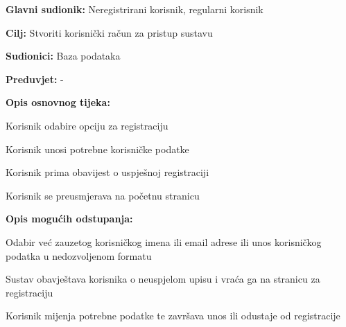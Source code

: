					\noindent {}
					\begin{packed_item}
	
						\item \textbf{Glavni sudionik: }Neregistrirani korisnik, regularni korisnik
						\item  \textbf{Cilj:} Stvoriti korisnički račun za pristup sustavu
						\item  \textbf{Sudionici:} Baza podataka
						\item  \textbf{Preduvjet:} -
						\item  \textbf{Opis osnovnog tijeka:}
						
						\item[] \begin{packed_enum}
	
							\item Korisnik odabire opciju za registraciju
							\item Korisnik unosi potrebne korisničke podatke
							\item Korisnik prima obavijest o uspješnoj registraciji
							\item Korisnik se preusmjerava na početnu stranicu

						\end{packed_enum}
						
						\item  \textbf{Opis mogućih odstupanja:}
						
						\item[] \begin{packed_item}
	
							\item[1.a] Odabir već zauzetog korisničkog imena ili email adrese ili unos korisničkog podatka u nedozvoljenom formatu
							\item[] \begin{packed_enum}
								
								\item Sustav obavještava korisnika o neuspjelom upisu i vraća ga na stranicu za registraciju
								\item Korisnik mijenja potrebne podatke te završava unos ili odustaje od registracije
								
							\end{packed_enum}
						\end{packed_item}
					\end{packed_item}
					

